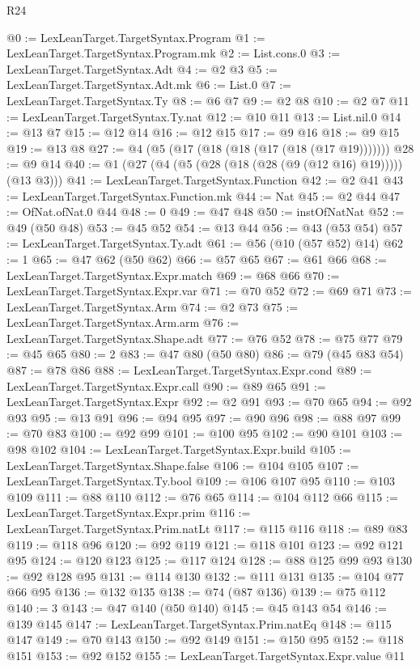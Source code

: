 \begin{lexlean}{R24}
\begin{coremodule}
@0 := LexLeanTarget.TargetSyntax.Program
@1 := LexLeanTarget.TargetSyntax.Program.mk
@2 := List.cons.{0}
@3 := LexLeanTarget.TargetSyntax.Adt
@4 := @2 @3
@5 := LexLeanTarget.TargetSyntax.Adt.mk
@6 := List.{0}
@7 := LexLeanTarget.TargetSyntax.Ty
@8 := @6 @7
@9 := @2 @8
@10 := @2 @7
@11 := LexLeanTarget.TargetSyntax.Ty.nat
@12 := @10 @11
@13 := List.nil.{0}
@14 := @13 @7
@15 := @12 @14
@16 := @12 @15
@17 := @9 @16
@18 := @9 @15
@19 := @13 @8
@27 := @4 (@5 (@17 (@18 (@18 (@17 (@18 (@17 @19)))))))
@28 := @9 @14
@40 := @1 (@27 (@4 (@5 (@28 (@18 (@28 (@9 (@12 @16) @19))))) (@13 @3)))
@41 := LexLeanTarget.TargetSyntax.Function
@42 := @2 @41
@43 := LexLeanTarget.TargetSyntax.Function.mk
@44 := Nat
@45 := @2 @44
@47 := OfNat.ofNat.{0} @44
@48 := 0
@49 := @47 @48
@50 := instOfNatNat
@52 := @49 (@50 @48)
@53 := @45 @52
@54 := @13 @44
@56 := @43 (@53 @54)
@57 := LexLeanTarget.TargetSyntax.Ty.adt
@61 := @56 (@10 (@57 @52) @14)
@62 := 1
@65 := @47 @62 (@50 @62)
@66 := @57 @65
@67 := @61 @66
@68 := LexLeanTarget.TargetSyntax.Expr.match
@69 := @68 @66
@70 := LexLeanTarget.TargetSyntax.Expr.var
@71 := @70 @52
@72 := @69 @71
@73 := LexLeanTarget.TargetSyntax.Arm
@74 := @2 @73
@75 := LexLeanTarget.TargetSyntax.Arm.arm
@76 := LexLeanTarget.TargetSyntax.Shape.adt
@77 := @76 @52
@78 := @75 @77
@79 := @45 @65
@80 := 2
@83 := @47 @80 (@50 @80)
@86 := @79 (@45 @83 @54)
@87 := @78 @86
@88 := LexLeanTarget.TargetSyntax.Expr.cond
@89 := LexLeanTarget.TargetSyntax.Expr.call
@90 := @89 @65
@91 := LexLeanTarget.TargetSyntax.Expr
@92 := @2 @91
@93 := @70 @65
@94 := @92 @93
@95 := @13 @91
@96 := @94 @95
@97 := @90 @96
@98 := @88 @97
@99 := @70 @83
@100 := @92 @99
@101 := @100 @95
@102 := @90 @101
@103 := @98 @102
@104 := LexLeanTarget.TargetSyntax.Expr.build
@105 := LexLeanTarget.TargetSyntax.Shape.false
@106 := @104 @105
@107 := LexLeanTarget.TargetSyntax.Ty.bool
@109 := @106 @107 @95
@110 := @103 @109
@111 := @88 @110
@112 := @76 @65
@114 := @104 @112 @66
@115 := LexLeanTarget.TargetSyntax.Expr.prim
@116 := LexLeanTarget.TargetSyntax.Prim.natLt
@117 := @115 @116
@118 := @89 @83
@119 := @118 @96
@120 := @92 @119
@121 := @118 @101
@123 := @92 @121 @95
@124 := @120 @123
@125 := @117 @124
@128 := @88 @125 @99 @93
@130 := @92 @128 @95
@131 := @114 @130
@132 := @111 @131
@135 := @104 @77 @66 @95
@136 := @132 @135
@138 := @74 (@87 @136)
@139 := @75 @112
@140 := 3
@143 := @47 @140 (@50 @140)
@145 := @45 @143 @54
@146 := @139 @145
@147 := LexLeanTarget.TargetSyntax.Prim.natEq
@148 := @115 @147
@149 := @70 @143
@150 := @92 @149
@151 := @150 @95
@152 := @118 @151
@153 := @92 @152
@155 := LexLeanTarget.TargetSyntax.Expr.value @11

\end{coremodule}
\end{lexlean}
